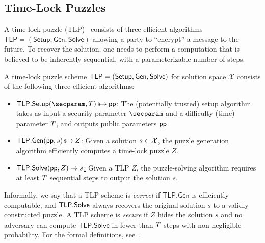 

\subsection{Time-Lock Puzzles}\label{sec:tlp}

A time-lock puzzle (TLP)~\cite{RivShaWag96} consists of three efficient algorithms $\mathsf{TLP} = (\mathsf{Setup}, \mathsf{Gen}, \mathsf{Solve})$ allowing a party to ``encrypt'' a message to the future. To recover the solution, one needs to perform a computation that is believed to be inherently sequential, with a parameterizable number of steps.

\begin{definition} A time-lock puzzle scheme $\sf TLP = (\mathsf{Setup}, \mathsf{Gen}, \mathsf{Solve})$ for solution space $\mathcal{X}$ consists of the following three efficient algorithms:
    \begin{itemize}
        \item \underline{$\mathsf{TLP.Setup}(\secparam, \Ttime) \randout \pparam$:} The (potentially trusted) setup algorithm takes as input a security parameter $\secparam$ and a difficulty (time) parameter $T$, and outputs public parameters $\mathsf{pp}$. %
        \item \underline{$\mathsf{TLP.Gen}(\mathsf{pp}, s) \,{\mbox{\scriptsize${\$}$\normalsize}\!\!\to}\hskip2.3pt Z$:} Given a solution $s \in \mathcal{X}$, the puzzle generation algorithm efficiently computes a time-lock puzzle $Z$.
        \item \underline{$\mathsf{TLP.Solve}(\mathsf{pp}, Z) \rightarrow s$:} Given a TLP $Z$, the puzzle-solving algorithm requires at least $T$ sequential steps to output the solution $s$.
    \end{itemize}
\end{definition}

Informally, we say that a TLP scheme is \emph{correct} if $\mathsf{TLP.Gen}$ is efficiently computable, and $\mathsf{TLP}.{\sf Solve}$ always recovers the original solution $s$ to a validly constructed puzzle. A TLP scheme is \emph{secure} if $Z$ hides the solution $s$ and no adversary can compute $\mathsf{TLP.Solve}$ in fewer than $T$ steps with non-negligible probability. For the formal definitions, see~\cite{C:MalThy19}.

